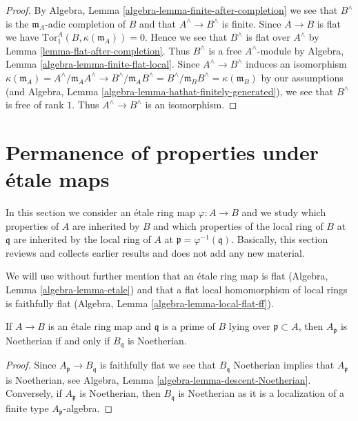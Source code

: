 \begin{proof}
By Algebra, Lemma \ref{algebra-lemma-finite-after-completion} we see that
$B^\wedge$ is the $\mathfrak m_A$-adic
completion of $B$ and that $A^\wedge \to B^\wedge$ is finite.
Since $A \to B$ is flat we have $\text{Tor}_1^A(B, \kappa(\mathfrak m_A)) = 0$.
Hence we see that $B^\wedge$ is flat over $A^\wedge$ by
Lemma \ref{lemma-flat-after-completion}.
Thus $B^\wedge$ is a free $A^\wedge$-module by
Algebra, Lemma \ref{algebra-lemma-finite-flat-local}.
Since $A^\wedge \to B^\wedge$ induces an isomorphism
$\kappa(\mathfrak m_A) = A^\wedge/\mathfrak m_A A^\wedge \to
B^\wedge/\mathfrak m_A B^\wedge = B^\wedge/\mathfrak m_B B^\wedge =
\kappa(\mathfrak m_B)$ by our assumptions
(and Algebra, Lemma \ref{algebra-lemma-hathat-finitely-generated}),
we see that $B^\wedge$ is free of rank $1$. Thus $A^\wedge \to B^\wedge$
is an isomorphism.
\end{proof}





\section{Permanence of properties under \'etale maps}
\label{section-permanence-etale}

\noindent
In this section we consider an \'etale ring map $\varphi : A \to B$
and we study which properties of $A$ are inherited by $B$
and which properties of the local ring of $B$ at $\mathfrak q$
are inherited by the local ring of $A$ at
$\mathfrak p = \varphi^{-1}(\mathfrak q)$.
Basically, this section reviews and collects earlier results
and does not add any new material.

\medskip\noindent
We will use without further mention that an \'etale ring map
is flat (Algebra, Lemma \ref{algebra-lemma-etale}) and that a
flat local homomorphism of local rings is faithfully flat
(Algebra, Lemma \ref{algebra-lemma-local-flat-ff}).

\begin{lemma}
\label{lemma-Noetherian-etale-extension}
If $A \to B$ is an \'etale ring map and $\mathfrak q$ is a prime of
$B$ lying over $\mathfrak p \subset A$, then
$A_{\mathfrak p}$ is Noetherian if and only if $B_{\mathfrak q}$ is
Noetherian.
\end{lemma}

\begin{proof}
Since $A_\mathfrak p \to B_\mathfrak q$ is faithfully flat
we see that $B_\mathfrak q$ Noetherian implies that $A_\mathfrak p$
is Noetherian, see
Algebra, Lemma \ref{algebra-lemma-descent-Noetherian}.
Conversely, if $A_\mathfrak p$ is Noetherian, then $B_\mathfrak q$
is Noetherian as it is a localization of a finite type
$A_\mathfrak p$-algebra.
\end{proof}

